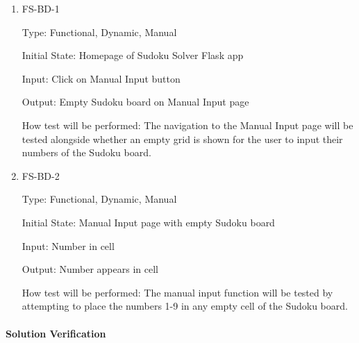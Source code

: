 \documentclass[11pt]{article}
\begin{document}
\begin{enumerate}

\item{FS-BD-1\\}

Type: Functional, Dynamic, Manual
					
Initial State: Homepage of Sudoku Solver Flask app
					
Input: Click on Manual Input button
					
Output: Empty Sudoku board on Manual Input page
					
How test will be performed: The navigation to the Manual Input page will be tested alongside whether an empty grid is shown for the user to input their numbers of the Sudoku board.
					
\item{FS-BD-2\\}

Type: Functional, Dynamic, Manual
					
Initial State: Manual Input page with empty Sudoku board
					
Input: Number in cell
					
Output: Number appears in cell
					
How test will be performed: The manual input function will be tested by attempting to place the numbers 1-9 in any empty cell of the Sudoku board.

\end{enumerate}

\paragraph{Solution Verification}
\end{document}
